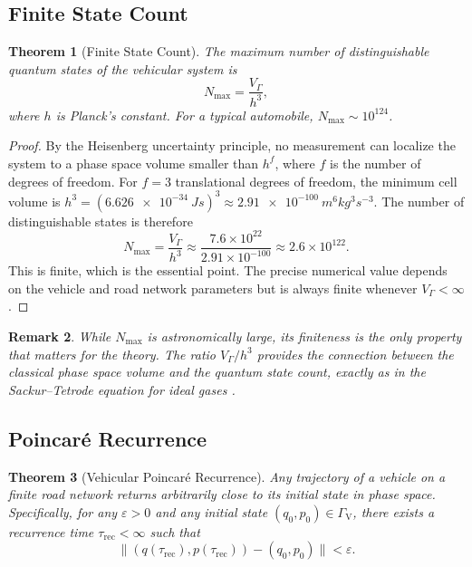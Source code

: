 \documentclass[twocolumn,10pt]{article}
\newtheorem{theorem}{Theorem}[section]
\newtheorem{remark}[theorem]{Remark}
\newcommand{\GammaV}{\Gamma_{\mathrm{V}}}
\newcommand{\VGamma}{V_{\Gamma}}
\newcommand{\Nmax}{N_{\mathrm{max}}}
\newcommand{\trec}{\tau_{\mathrm{rec}}}
\begin{document}
\subsection{Finite State Count}

\begin{theorem}[Finite State Count]\label{thm:statecount}
The maximum number of distinguishable quantum states of the vehicular system is
\begin{equation}\label{eq:Nmax}
\Nmax = \frac{\VGamma}{h^3},
\end{equation}
where $h$ is Planck's constant. For a typical automobile, $\Nmax \sim 10^{124}$.
\end{theorem}

\begin{proof}
By the Heisenberg uncertainty principle, no measurement can localize the system to a phase space volume smaller than $h^f$, where $f$ is the number of degrees of freedom. For $f = 3$ translational degrees of freedom, the minimum cell volume is $h^3 = (\SI{6.626e-34}{J s})^3 \approx \SI{2.91e-100}{m^6 kg^3 s^{-3}}$. The number of distinguishable states is therefore
\begin{equation}
\Nmax = \frac{\VGamma}{h^3} \approx \frac{7.6 \times 10^{22}}{2.91 \times 10^{-100}} \approx 2.6 \times 10^{122}.
\end{equation}
This is finite, which is the essential point. The precise numerical value depends on the vehicle and road network parameters but is always finite whenever $\VGamma < \infty$.
\end{proof}

\begin{remark}
While $\Nmax$ is astronomically large, its finiteness is the only property that matters for the theory. The ratio $\VGamma / h^3$ provides the connection between the classical phase space volume and the quantum state count, exactly as in the Sackur--Tetrode equation for ideal gases \cite{landau1980}.
\end{remark}

\subsection{Poincar\'{e} Recurrence}

\begin{theorem}[Vehicular Poincar\'{e} Recurrence]\label{thm:poincare}
Any trajectory of a vehicle on a finite road network returns arbitrarily close to its initial state in phase space. Specifically, for any $\varepsilon > 0$ and any initial state $(q_0, p_0) \in \GammaV$, there exists a recurrence time $\trec < \infty$ such that
\begin{equation}
\|(q(\trec), p(\trec)) - (q_0, p_0)\| < \varepsilon.
\end{equation}
\end{theorem}
\end{document}
